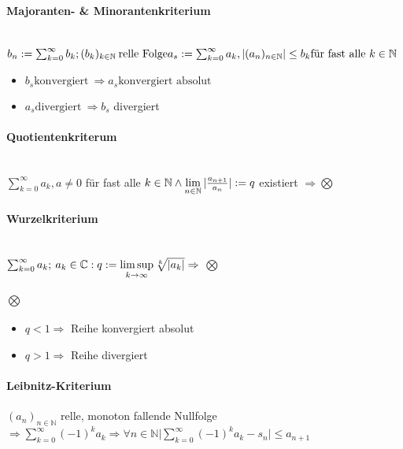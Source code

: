 \documentclass[paper=a3,paper=landscape, fontsize=9pt, DIV=30]{scrartcl}
\newcommand{\compl}{\mathbb{C}}
\newcommand{\nat}{\mathbb{N}}
\newcommand{\aseq}{(a_n)_{n \in \nat}}
\begin{document}
\begin{multicols*}{4}
  \paragraph{Majoranten- \& Minorantenkriterium}\hspace{0pt} \\
  $ b_n := \sum_{k=0}^{\infty} b_k; (b_k)_{k \in \nat}\:\text{relle Folge}\\ a_s := \sum_{k=0}^{\infty} a_k, |\aseq| \leq b_k \text{für fast alle}\ k \in \nat$
  \begin{itemize}
  \item $b_s \text{konvergiert}\ \Rightarrow a_s \text{konvergiert absolut}$
  \item $a_s \text{divergiert}\ \Rightarrow b_s$ divergiert
  \end{itemize}

  \paragraph{Quotientenkriterum}\hspace{0pt} \\
  $ \sum_{k=0}^{\infty} a_k, a \neq 0$ für fast alle $k \in \nat \wedge \lim\limits_{n \in \nat} \arrowvert \frac{a_{n+1}}{a_n} \arrowvert := q$ existiert $\Rightarrow \bigotimes$

  \paragraph{Wurzelkriterium}\hspace{0pt} \\
  $ \sum_{k=0}^{\infty} a_k;\:a_k \in \compl: q := \limsup\limits_{k \rightarrow \infty} \sqrt[k]{\arrowvert a_k \arrowvert} \Rightarrow$ $\bigotimes$

  \paragraph{$\bigotimes$}
  \begin{itemize}
  \item $q < 1 \Rightarrow$ Reihe konvergiert absolut
  \item $q > 1 \Rightarrow$ Reihe divergiert
  \end{itemize}

  \paragraph{Leibnitz-Kriterium}
  $\aseq$ relle, monoton fallende Nullfolge $ \Rightarrow \sum_{k=0}^{\infty} (-1)^ka_k \Rightarrow \forall n \in \nat \lvert \sum_{k=0}^{\infty}(-1)^ka_k-s_n \rvert \leq  a_{n+1}$


\end{multicols*}
\end{document}
